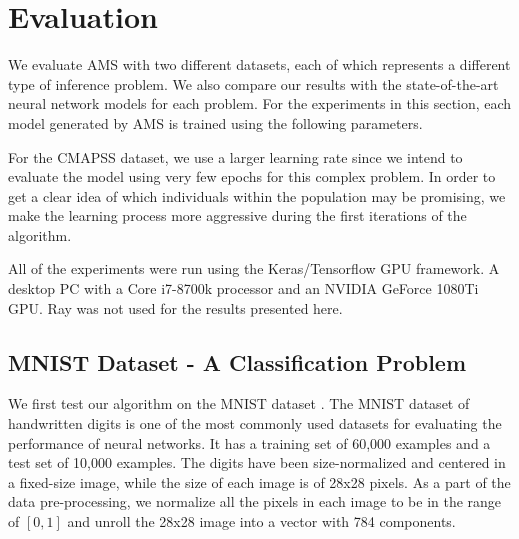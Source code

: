 \documentclass[preprint,12pt]{elsarticle}%
\begin{document}
\section{Evaluation}
\label{sec:evaluation}

We evaluate AMS with two different datasets, each of which represents a different type of inference problem. We also compare our results with the state-of-the-art neural network models for each problem. For the experiments in this section, each model generated by AMS is trained using the following parameters.

\begin{table}[H]
\begin{center}
\end{center}
\caption{Training parameters for each of the used datasets.}
\label{table:training_params}
\end{table}

For the CMAPSS dataset, we use a larger learning rate since we intend to evaluate the model using very few epochs for this complex problem. In order to get a clear idea of which individuals within the population may be promising, we make the learning process more aggressive during the first iterations of the algorithm. 

All of the experiments were run using the Keras/Tensorflow GPU framework. A desktop PC with a Core i7-8700k processor and an NVIDIA GeForce 1080Ti GPU. Ray was not used for the results presented here.

\subsection{MNIST Dataset - A Classification Problem}

We first test our algorithm on the MNIST dataset \cite{Lecun1989}. The MNIST dataset of handwritten digits is one of the most commonly used datasets for evaluating the performance of neural networks. It has a training set of 60,000 examples and a test set of 10,000 examples. The digits have been size-normalized and centered in a fixed-size image, while the size of each image is of 28x28 pixels. As a part of the data pre-processing, we normalize all the pixels in each image to be in the range of $[0,1]$ and unroll the 28x28 image into a vector with 784 components.
\end{document}
